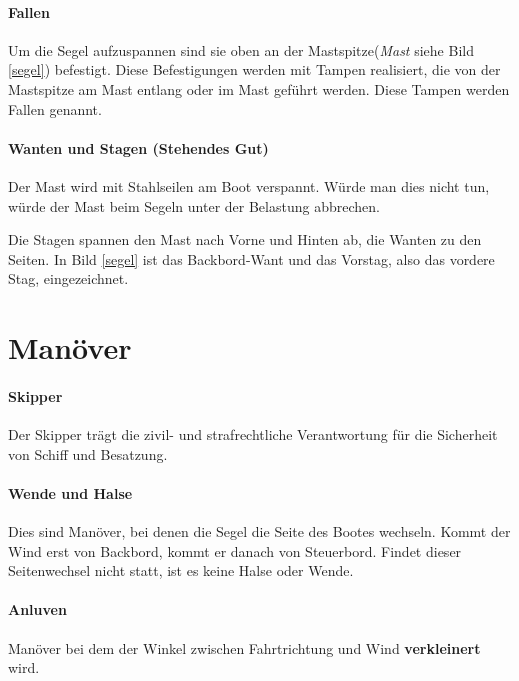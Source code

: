\documentclass[12pt]{article}
\newcommand{\xbox}[1]{\vspace{1em}\fcolorbox{grey}{white}{\parbox{0.8\textwidth}{\textcolor{grey}{#1}}}}
\begin{document}
\xbox{Je nach Gegebenheiten im Hafen werden andere Leinen ausgelegt. Vor jedem Anlegemanöver werden wir die Reihenfolge und Anzahl der Leinen mit euch besprechen.}

\paragraph{Fallen}
Um die Segel aufzuspannen sind sie oben an der Mastspitze(\textit{Mast} siehe Bild \ref{segel}) befestigt. Diese Befestigungen werden mit Tampen realisiert, die von der Mastspitze am Mast entlang oder im Mast geführt werden. Diese Tampen werden Fallen genannt.

\paragraph{Wanten und Stagen (Stehendes Gut)}
Der Mast wird mit Stahlseilen am Boot verspannt. Würde man dies nicht tun, würde der Mast beim Segeln unter der Belastung abbrechen.

Die Stagen spannen den Mast nach Vorne und Hinten ab, die Wanten zu den Seiten. In Bild \ref{segel} ist das Backbord-Want und das Vorstag, also das vordere Stag, eingezeichnet.


\section{Manöver}

\paragraph{Skipper}
Der Skipper trägt die zivil- und strafrechtliche Verantwortung für die Sicherheit von Schiff und Besatzung.

\paragraph{Wende und Halse}
Dies sind Manöver, bei denen die Segel die Seite des Bootes wechseln. Kommt der Wind erst von Backbord, kommt er danach von Steuerbord. Findet dieser Seitenwechsel nicht statt, ist es keine Halse oder Wende.

\paragraph{Anluven}
Manöver bei dem der Winkel zwischen Fahrtrichtung und Wind \textbf{verkleinert} wird.
\end{document}
